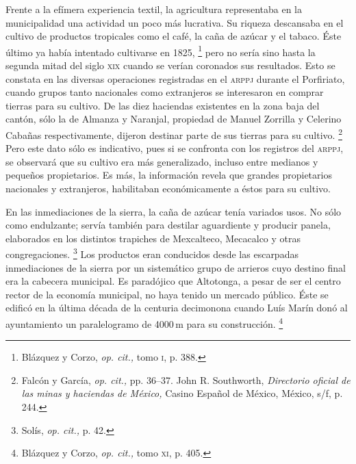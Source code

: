 \documentclass[14pt,twoside,final]{extbook} %
\let\oldfootnote\footnote
\renewcommand\footnote[1]{%
\oldfootnote{\hspace{1mm}#1}}
\begin{document}
Frente a la efímera experiencia textil, la agricultura representaba en la municipalidad una actividad un poco más lucrativa. Su riqueza descansaba en el cultivo de productos tropicales como el café, la caña de azúcar y el tabaco. Éste último ya había intentado cultivarse en 1825,\footnote{Blázquez y Corzo, \emph{op. cit.,} tomo \textsc{i}, p. 388.} pero no sería sino hasta la segunda mitad del siglo \textsc{xix} cuando se verían coronados sus resultados. Esto se constata en las diversas operaciones registradas en el \textsc{arppj} durante el Porfiriato, cuando grupos tanto nacionales como extranjeros se interesaron en comprar tierras para su cultivo. De las diez haciendas existentes en la zona baja del cantón, sólo la de Almanza y Naranjal, propiedad de Manuel Zorrilla y Celerino Cabañas respectivamente, dijeron destinar parte de sus tierras para su cultivo.\footnote{Falcón y García, \emph{op. cit.,} pp. 36--37. John R. Southworth, \emph{Directorio oficial de las minas y haciendas de México,} Casino Español de México, México, s/f, p. 244.} Pero este dato sólo es indicativo, pues si se confronta con los registros del \textsc{arppj}, se observará que su cultivo era más generalizado, incluso entre medianos y pequeños propietarios. Es más, la información revela que grandes propietarios nacionales y extranjeros, habilitaban económicamente a éstos para su cultivo.

En las inmediaciones de la sierra, la caña de azúcar tenía variados usos. No sólo como endulzante; servía también para destilar aguardiente y producir panela, elaborados en los distintos trapiches de Mexcalteco, Mecacalco y otras congregaciones.\footnote{Solís, \emph{op. cit.,} p. 42.} Los productos eran conducidos desde las escarpadas inmediaciones de la sierra por un sistemático grupo de arrieros cuyo destino final era la cabecera municipal. Es paradójico que Altotonga, a pesar de ser el centro rector de la economía municipal, no haya tenido un mercado público. Éste se edificó en la última década de la centuria decimonona cuando Luís Marín donó al ayuntamiento un paralelogramo de 4000\,m para su construcción.\footnote{Blázquez y Corzo, \emph{op. cit.,} tomo \textsc{xi}, p. 405.}
\end{document}

